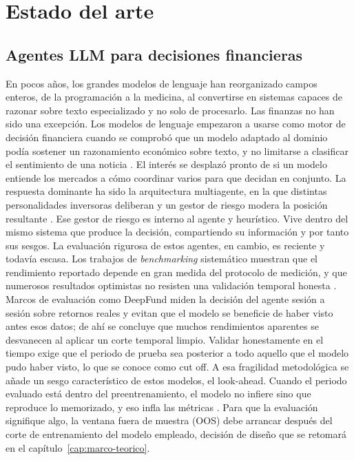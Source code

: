 \chapter{Estado del arte}
\label{cap:estado-arte}

\section{Agentes LLM para decisiones financieras}
\label{sec:agentes-llm}

En pocos años, los grandes modelos de lenguaje han reorganizado campos enteros, de la programación a la medicina, al convertirse en sistemas capaces de razonar sobre texto especializado y no solo de procesarlo. Las finanzas no han sido una excepción. Los modelos de lenguaje empezaron a usarse como motor de decisión financiera cuando se comprobó que un modelo adaptado al dominio podía sostener un razonamiento económico sobre texto, y no limitarse a clasificar el sentimiento de una noticia \cite{yang2023fingpt}. El interés se desplazó pronto de si un modelo entiende los mercados a cómo coordinar varios para que decidan en conjunto. La respuesta dominante ha sido la arquitectura multiagente, en la que distintas personalidades inversoras deliberan y un gestor de riesgo modera la posición resultante \cite{xiao2024tradingagents}. Ese gestor de riesgo es interno al agente y heurístico. Vive dentro del mismo sistema que produce la decisión, compartiendo su información y por tanto sus sesgos.
La evaluación rigurosa de estos agentes, en cambio, es reciente y todavía escasa. Los trabajos de \emph{benchmarking} sistemático muestran que el rendimiento reportado depende en gran medida del protocolo de medición, y que numerosos resultados optimistas no resisten una validación temporal honesta \cite{li2025deepfund}. Marcos de evaluación como DeepFund miden la decisión del agente sesión a sesión sobre retornos reales y evitan que el modelo se beneficie de haber visto antes esos datos; de ahí se concluye que muchos rendimientos aparentes se desvanecen al aplicar un corte temporal limpio. Validar honestamente en el tiempo exige que el periodo de prueba sea posterior a todo aquello que el modelo pudo haber visto, lo que se conoce como cut off. A esa fragilidad metodológica se añade un sesgo característico de estos modelos, el look-ahead. Cuando el periodo evaluado está dentro del preentrenamiento, el modelo no infiere sino que reproduce lo memorizado, y eso infla las métricas \cite{benhenda2026lookahead}. Para que la evaluación signifique algo, la ventana fuera de muestra (OOS) debe arrancar después del corte de entrenamiento del modelo empleado, decisión de diseño que se retomará en el capítulo~\ref{cap:marco-teorico}.

